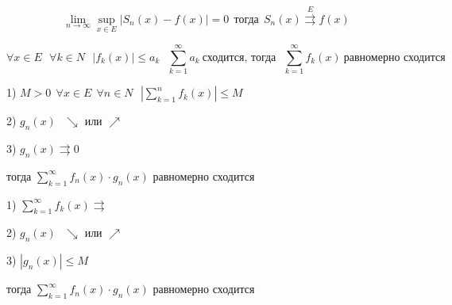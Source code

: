 \documentclass{article}
\begin{document}
\begin{block}
  $$
  \lim_{n \to \infty} \sup\limits_{x \in E} |S_n(x) - f(x)| = 0 ~~ \text{тогда} ~~
  S_n(x) \stackrel{E}{\rightrightarrows} f(x)
  $$
\end{block}

\begin{block}
  $$
  \forall x \in E ~~~ \forall k \in N ~~~ |f_k(x)| \le a_k ~~~
  \sum_{k=1}^{\infty}a_k ~ \text{сходится, тогда} ~~~
  \sum_{k=1}^{\infty} f_k (x) ~ \text{равномерно сходится}
  $$
\end{block}

\begin{block}
  1)
  $
  M > 0 ~~ \forall x \in E ~~ \forall n \in N ~~~
  \left| \sum_{k=1}^n f_k(x) \right| \le M
  $

  2) $g_n(x) ~~~ \searrow$ или $\nearrow$

  3) $g_n(x) \rightrightarrows 0$

  тогда $\sum_{k=1}^{\infty} f_n(x) \cdot g_n(x)$ равномерно сходится
\end{block}


\begin{block}
  1) $\sum_{k=1}^{\infty} f_k(x) \rightrightarrows$

  2) $g_n(x) ~~~ \searrow$ или $\nearrow$

  3) $|g_n(x)| \le M$

  тогда $\sum_{k=1}^{\infty} f_n(x) \cdot g_n(x)$ равномерно сходится
\end{block}
\end{document}

